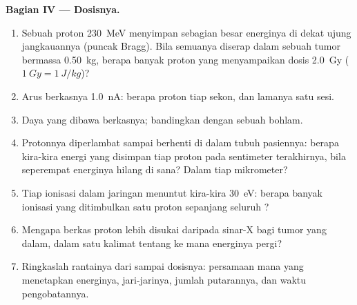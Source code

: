 \begin{problem}
\medskip
\noindent\textbf{Bagian IV --- Dosisnya.}
\begin{enumerate}[resume]
  \item Sebuah proton \qty{230}{MeV} menyimpan sebagian besar energinya di dekat
        ujung jangkauannya (puncak Bragg). Bila semuanya diserap dalam sebuah
        tumor bermassa \qty{0.50}{kg}, berapa banyak proton yang menyampaikan dosis
        \qty{2.0}{Gy} ($\qty{1}{Gy} = \qty{1}{J/kg}$)?
  \item Arus berkasnya \qty{1.0}{nA}: berapa proton tiap sekon, dan
        lamanya satu sesi.
  \item Daya yang dibawa berkasnya; bandingkan dengan sebuah bohlam.
  \item Protonnya diperlambat sampai berhenti di dalam tubuh pasiennya: berapa
        kira-kira energi yang disimpan tiap proton pada sentimeter terakhirnya,
        bila seperempat energinya hilang di sana? Dalam  tiap
        mikrometer?
  \item Tiap ionisasi dalam jaringan menuntut kira-kira \qty{30}{eV}: berapa
        banyak ionisasi yang ditimbulkan satu proton sepanjang seluruh ?
  \item Mengapa berkas proton lebih disukai daripada sinar-X bagi tumor yang
        dalam, dalam satu kalimat tentang ke mana energinya pergi?
  \item Ringkaslah rantainya dari  sampai dosisnya: persamaan mana
        yang menetapkan energinya, jari-jarinya, jumlah putarannya, dan
        waktu pengobatannya.
\end{enumerate}
\end{problem}
